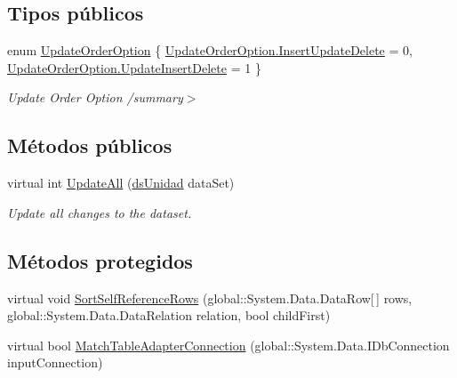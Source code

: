 \subsection*{Tipos públicos}
\begin{DoxyCompactItemize}
\item 
enum \hyperlink{class_proyecto___integrador__3_1_1ds_unidad_table_adapters_1_1_table_adapter_manager_abc7bc304d216e1258eb95cc9c8b98997}{Update\-Order\-Option} \{ \hyperlink{class_proyecto___integrador__3_1_1ds_unidad_table_adapters_1_1_table_adapter_manager_abc7bc304d216e1258eb95cc9c8b98997a27b77cb15d3da7ded0250d0001bc6755}{Update\-Order\-Option.\-Insert\-Update\-Delete} = 0, 
\hyperlink{class_proyecto___integrador__3_1_1ds_unidad_table_adapters_1_1_table_adapter_manager_abc7bc304d216e1258eb95cc9c8b98997a894fcc001e51f673d3fb5f3096473dd8}{Update\-Order\-Option.\-Update\-Insert\-Delete} = 1
 \}
\begin{DoxyCompactList}\small\item\em Update Order Option /summary$>$ \end{DoxyCompactList}\end{DoxyCompactItemize}
\subsection*{Métodos públicos}
\begin{DoxyCompactItemize}
\item 
virtual int \hyperlink{class_proyecto___integrador__3_1_1ds_unidad_table_adapters_1_1_table_adapter_manager_af271d5dc921b30c284b99a8eb130e79c}{Update\-All} (\hyperlink{class_proyecto___integrador__3_1_1ds_unidad}{ds\-Unidad} data\-Set)
\begin{DoxyCompactList}\small\item\em Update all changes to the dataset. \end{DoxyCompactList}\end{DoxyCompactItemize}
\subsection*{Métodos protegidos}
\begin{DoxyCompactItemize}
\item 
virtual void \hyperlink{class_proyecto___integrador__3_1_1ds_unidad_table_adapters_1_1_table_adapter_manager_ad2def72851e1a067c2b1dd7654edb72a}{Sort\-Self\-Reference\-Rows} (global\-::\-System.\-Data.\-Data\-Row\mbox{[}$\,$\mbox{]} rows, global\-::\-System.\-Data.\-Data\-Relation relation, bool child\-First)
\item 
virtual bool \hyperlink{class_proyecto___integrador__3_1_1ds_unidad_table_adapters_1_1_table_adapter_manager_a3c219763f9499809f966ddd0eae2f4d5}{Match\-Table\-Adapter\-Connection} (global\-::\-System.\-Data.\-I\-Db\-Connection input\-Connection)
\end{DoxyCompactItemize}
